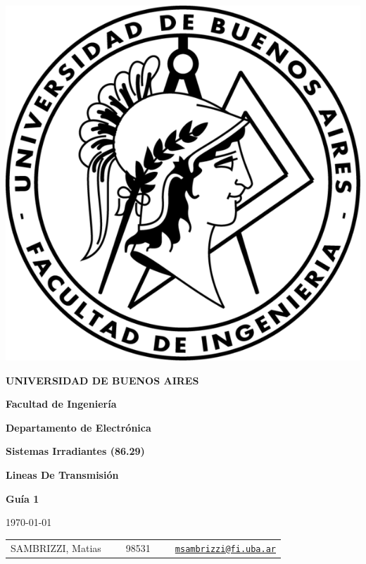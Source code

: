 \begin{titlepage}
\thispagestyle{empty}

\begin{center}

\includegraphics[scale=1.2]{Imagenes/Logo_Fiuba2.png}

\bigskip
\textbf{UNIVERSIDAD DE BUENOS AIRES}

\smallskip

\textbf{Facultad de Ingeniería}

\smallskip

\textbf{Departamento de Electrónica}

\vspace{2cm}

\textbf{\Large{Sistemas Irradiantes (86.29)}}

\vspace{1cm}

\textbf{\large{Lineas De Transmisión}}

\vspace{0.5cm}

\textbf{\large{Guía 1}}

\vspace{1cm}

\today

\vspace{1cm}

\begin{tabular}{lcl}
SAMBRIZZI, Matias & \ \ \ 98531 & \ \ \ 
\texttt{\href{mailto:msambrizzi@fi.uba.ar}{msambrizzi@fi.uba.ar}}\\
\end{tabular}

\end {center}

\end{titlepage}
\newpage
\pagestyle{fancy}
